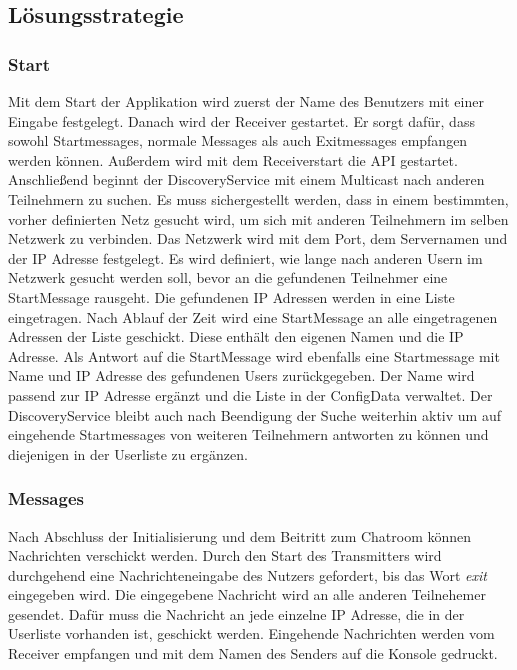 \subsection{Lösungsstrategie}
\subsubsection{Start}
Mit dem Start der Applikation wird zuerst der Name des Benutzers mit einer Eingabe festgelegt. Danach wird der Receiver gestartet. Er sorgt dafür, dass sowohl Startmessages, normale Messages als auch Exitmessages empfangen werden können. Außerdem wird mit dem Receiverstart die API gestartet.
Anschließend beginnt der DiscoveryService mit einem Multicast nach anderen Teilnehmern zu suchen. Es muss sichergestellt werden, dass in einem bestimmten, vorher definierten Netz gesucht wird,
um sich mit anderen Teilnehmern im selben Netzwerk zu verbinden. Das Netzwerk wird mit dem Port, dem Servernamen und der IP Adresse festgelegt. Es wird definiert, wie lange nach anderen Usern im Netzwerk gesucht werden soll, bevor an die gefundenen
Teilnehmer eine StartMessage rausgeht. Die gefundenen IP Adressen werden in eine Liste eingetragen. 
Nach Ablauf der Zeit wird eine StartMessage an alle eingetragenen Adressen der Liste geschickt. Diese enthält den eigenen Namen und die IP Adresse. 
Als Antwort auf die StartMessage wird ebenfalls eine Startmessage mit Name und IP Adresse des gefundenen Users zurückgegeben.
Der Name wird passend zur IP Adresse ergänzt und die Liste in der ConfigData verwaltet. 
Der DiscoveryService bleibt auch nach Beendigung der Suche weiterhin aktiv um auf eingehende Startmessages von weiteren Teilnehmern antworten zu können und diejenigen in der Userliste zu ergänzen.

\subsubsection{Messages}
Nach Abschluss der Initialisierung und dem Beitritt zum Chatroom können Nachrichten verschickt werden. Durch den Start des Transmitters wird durchgehend eine Nachrichteneingabe des Nutzers gefordert, 
bis das Wort \emph{exit} eingegeben wird.
Die eingegebene Nachricht wird an alle anderen Teilnehemer gesendet. Dafür muss die Nachricht an jede einzelne IP Adresse, die in der Userliste vorhanden ist, geschickt werden.
Eingehende Nachrichten werden vom Receiver empfangen und mit dem Namen des Senders auf die Konsole gedruckt. 

